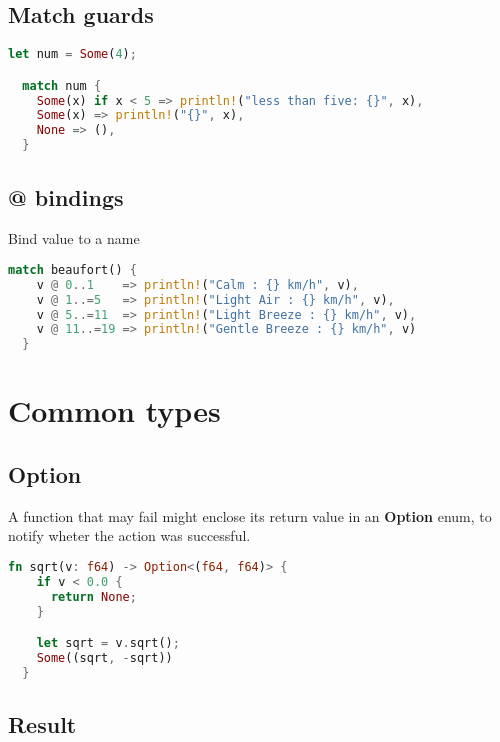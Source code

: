 \documentclass[a4paper]{article}
\begin{document}
\pagebreak

\subsection{Match guards}

\begin{lstlisting}[language=Rust, style=boxed, numbers=none]
  let num = Some(4);

  match num {
    Some(x) if x < 5 => println!("less than five: {}", x),
    Some(x) => println!("{}", x),
    None => (),
  }
\end{lstlisting}

\subsection{@ bindings}

Bind value to a name

\begin{lstlisting}[language=Rust, style=boxed, numbers=none]
  match beaufort() {
    v @ 0..1    => println!("Calm : {} km/h", v),
    v @ 1..=5   => println!("Light Air : {} km/h", v),
    v @ 5..=11  => println!("Light Breeze : {} km/h", v),
    v @ 11..=19 => println!("Gentle Breeze : {} km/h", v)
  }
\end{lstlisting}

\pagebreak

\section{Common types}

\subsection{Option}

A function that may fail might enclose its return value in an
\textbf{Option} enum, to notify wheter the action was successful.

\begin{lstlisting}[language=Rust, style=boxed, numbers=none]
  fn sqrt(v: f64) -> Option<(f64, f64)> {
    if v < 0.0 {
      return None;
    }

    let sqrt = v.sqrt();
    Some((sqrt, -sqrt))
  }
\end{lstlisting}

\subsection{Result}
\end{document}
